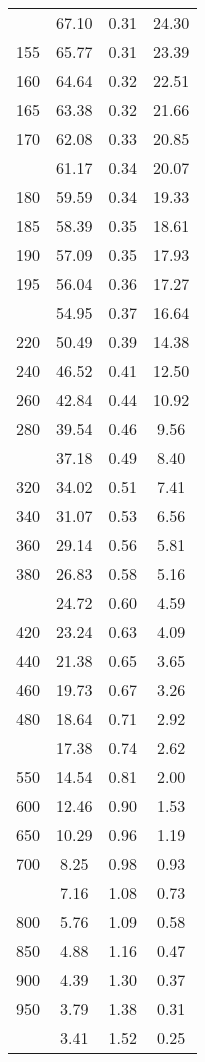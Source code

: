 \begin{table}[t]
\begin{tabular}{lccc}
   \addlinespace
150 & 67.10 & 0.31 & 24.30 \\ 
  155 & 65.77 & 0.31 & 23.39 \\ 
  160 & 64.64 & 0.32 & 22.51 \\ 
  165 & 63.38 & 0.32 & 21.66 \\ 
  170 & 62.08 & 0.33 & 20.85 \\ 
   \addlinespace
175 & 61.17 & 0.34 & 20.07 \\ 
  180 & 59.59 & 0.34 & 19.33 \\ 
  185 & 58.39 & 0.35 & 18.61 \\ 
  190 & 57.09 & 0.35 & 17.93 \\ 
  195 & 56.04 & 0.36 & 17.27 \\ 
   \addlinespace
200 & 54.95 & 0.37 & 16.64 \\ 
  220 & 50.49 & 0.39 & 14.38 \\ 
  240 & 46.52 & 0.41 & 12.50 \\ 
  260 & 42.84 & 0.44 & 10.92 \\ 
  280 & 39.54 & 0.46 & 9.56 \\ 
   \addlinespace
300 & 37.18 & 0.49 & 8.40 \\ 
  320 & 34.02 & 0.51 & 7.41 \\ 
  340 & 31.07 & 0.53 & 6.56 \\ 
  360 & 29.14 & 0.56 & 5.81 \\ 
  380 & 26.83 & 0.58 & 5.16 \\ 
   \addlinespace
400 & 24.72 & 0.60 & 4.59 \\ 
  420 & 23.24 & 0.63 & 4.09 \\ 
  440 & 21.38 & 0.65 & 3.65 \\ 
  460 & 19.73 & 0.67 & 3.26 \\ 
  480 & 18.64 & 0.71 & 2.92 \\ 
   \addlinespace
500 & 17.38 & 0.74 & 2.62 \\ 
  550 & 14.54 & 0.81 & 2.00 \\ 
  600 & 12.46 & 0.90 & 1.53 \\ 
  650 & 10.29 & 0.96 & 1.19 \\ 
  700 & 8.25 & 0.98 & 0.93 \\ 
   \addlinespace
750 & 7.16 & 1.08 & 0.73 \\ 
  800 & 5.76 & 1.09 & 0.58 \\ 
  850 & 4.88 & 1.16 & 0.47 \\ 
  900 & 4.39 & 1.30 & 0.37 \\ 
  950 & 3.79 & 1.38 & 0.31 \\ 
   \addlinespace
1000 & 3.41 & 1.52 & 0.25 \\ 
   \bottomrule
\end{tabular}
\end{table}

